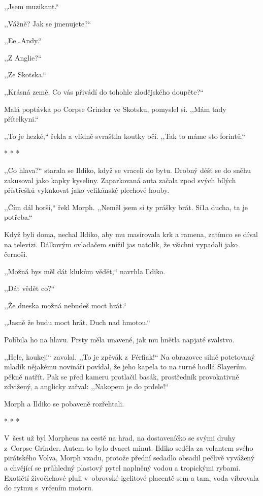,,Jsem muzikant.``

,,Vážně? Jak se jmenujete?``

,,Ee\ldots Andy.``

,,Z Anglie?``

,,Ze Skotska.``

,,Krásná země. Co vás přivádí do tohohle zlodějského doupěte?``

Malá poptávka po Corpse Grinder ve Skotsku, pomyslel si. ,,Mám tady přítelkyni.``

,,To je hezké,`` řekla a vlídně svraštila koutky očí. ,,Tak to máme sto forintů.``

\begin{center}
* * *
\end{center} 

,,Co hlava?`` starala se Ildiko, když se vraceli do bytu. Drobný déšť se do sněhu zakusoval jako kapky kyseliny. Zaparkovaná auta začala zpod svých bílých přístřešků vykukovat jako velikánské plechové houby.

,,Čím dál horší,`` řekl Morph. ,,Neměl jsem si ty prášky brát. Sí1a ducha, ta je potřeba.``

Když byli doma, nechal Ildiko, aby mu masírovala krk a ramena, zatímco se díval na televizi. Dálkovým ovladačem snížil jas natolik, že všichni vypadali jako černoši.

,,Možná bys měl dát klukům vědět,`` navrhla Ildiko.

,,Dát vědět co?``

,,Že dneska možná nebudeš moct hrát.``

,,Jasně že budu moct hrát. Duch nad hmotou.``

Políbila ho na hlavu. Prsty měla unavené, jak mu hnětla napjaté svalstvo.

,,Hele, koukej!`` zavolal. ,,To je zpěvák z Férfiak!`` Na obrazovce silně potetovaný mladík nějakému novináři povídal, že jeho kapela to na turné hodlá Slayerům pěkně natřít. Pak se před kameru protlačil basák, prostředník provokativně zdvižený, a anglicky zařval: ,,Nakopem je do prdele!``

Morph a Ildiko se pobaveně rozřehtali.

\begin{center}
* * *
\end{center}

V šest už byl Morpheus na cestě na hrad, na dostaveníčko se svými druhy z Corpse Grinder. Autem to bylo dvacet minut. Ildiko seděla za volantem svého pirátského Volva, Morph vzadu, protože přední sedadlo obsadil pečlivě vyvážený a chvějící se průhledný plastový pytel naplněný vodou a tropickými rybami. Exotičtí živočichové pluli v obrovské igelitové placentě sem a tam, voda vibrovala do rytmu s vrčením motoru.

